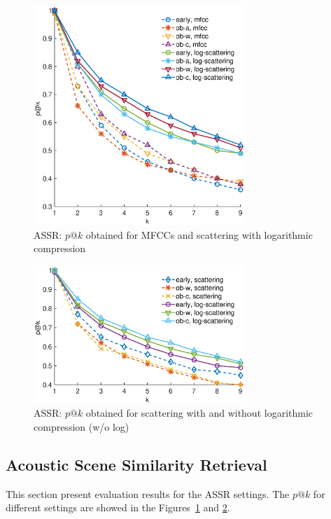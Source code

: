 \documentclass[journal]{IEEEtran}
\begin{document}
\begin{figure}
\begin{center}
\includegraphics[width=8cm]{gfx/unsupervised_test3.eps}
\caption{ASSR: $p@k$ obtained for MFCCs and scattering with logarithmic compression}
\label{fig:ASS_1}
\end{center}
\end{figure}

\begin{figure}
\begin{center}
\includegraphics[width=8cm]{gfx/unsupervised_test2.eps}
\caption{ASSR: $p@k$ obtained for scattering with and without logarithmic compression (w/o log)}
\label{fig:ASS_2}
\end{center}
\end{figure}

\subsection{Acoustic Scene Similarity Retrieval}

This section present evaluation results for the ASSR settings. The $p@k$ for different settings are showed in the Figures~\ref{fig:ASS_1} and \ref{fig:ASS_2}.
\end{document}
